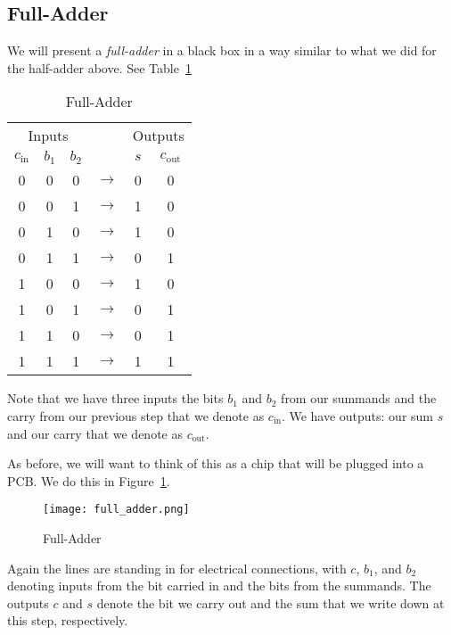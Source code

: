\subsection{Full-Adder}
We will present a \emph{full-adder} in a black box in a way similar to what we did for the half-adder above.  See Table~\ref{table:full-adder}
\begin{table}
	\begin{center}
	\begin{tabular}{cccccc}
		\multicolumn{3}{c}{Inputs} &  & \multicolumn{2}{c}{Outputs} \\
		$c_\text{in}$ & $b_1$ & $b_2$ &             & $s$ & $c_\text{out}$ \\ \hline 
		0 & 0   &   0   & $\rightarrow$ & 0   & 0  \\
		0 & 0   &   1   & $\rightarrow$ & 1   & 0  \\			  
		0 & 1   &   0   & $\rightarrow$ & 1   & 0  \\			  
		0 & 1   &   1   & $\rightarrow$ & 0   & 1  \\		
		1 & 0   &   0   & $\rightarrow$ & 1   & 0  \\
		1 & 0   &   1   & $\rightarrow$ & 0   & 1  \\			  
		1 & 1   &   0   & $\rightarrow$ & 0   & 1  \\			  
		1 & 1   &   1   & $\rightarrow$ & 1   & 1  \\						  
	\end{tabular}
\end{center}
	\caption{Full-Adder}\label{table:full-adder}
\end{table}
Note that we have three inputs the bits $b_1$ and $b_2$ from our summands and the carry from our previous step that we denote as $c_\text{in}$.  We have outputs: our sum $s$ and our carry that we denote as $c_\text{out}$.

As before, we will want to think of this as a chip that will be plugged into a PCB.  We do this in Figure~\ref{figure:full-adder}.
\begin{figure}
	\begin{center}
		\texttt{[image: full\_adder.png]}
	\end{center}
	\caption{Full-Adder}\label{figure:full-adder}
\end{figure}
Again the lines are standing in for electrical connections, with $c$, $b_1$, and $b_2$ denoting inputs from the bit carried in and the bits from the summands. The outputs $c$ and $s$ denote the bit we carry out and the sum that we write down at this step, respectively.

